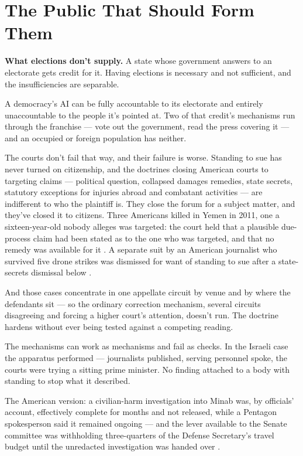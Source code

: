 \part{The Public That Should Form Them}

\textbf{What elections don't supply.} A state whose government answers to an electorate gets credit for it. Having elections is necessary and not sufficient, and the insufficiencies are separable.


A democracy's AI can be fully accountable to its electorate and entirely unaccountable to the people it's pointed at. Two of that credit's mechanisms run through the franchise — vote out the government, read the press covering it — and an occupied or foreign population has neither.

The courts don't fail that way, and their failure is worse. Standing to sue has never turned on citizenship, and the doctrines closing American courts to targeting claims — political question, collapsed damages remedies, state secrets, statutory exceptions for injuries abroad and combatant activities — are indifferent to who the plaintiff is. They close the forum for a subject matter, and they've closed it to citizens. Three Americans killed in Yemen in 2011, one a sixteen-year-old nobody alleges was targeted: the court held that a plausible due-process claim had been stated as to the one who was targeted, and that no remedy was available for it \autocite{alaulaqi2014panetta}. A separate suit by an American journalist who survived five drone strikes was dismissed for want of standing to sue after a state-secrets dismissal below \autocite{kareem2021}.

And those cases concentrate in one appellate circuit by venue and by where the defendants sit — so the ordinary correction mechanism, several circuits disagreeing and forcing a higher court's attention, doesn't run. The doctrine hardens without ever being tested against a competing reading.


The mechanisms can work as mechanisms and fail as checks. In the Israeli case the apparatus performed — journalists published, serving personnel spoke, the courts were trying a sitting prime minister. No finding attached to a body with standing to stop what it described.

The American version: a civilian-harm investigation into Minab was, by officials' account, effectively complete for months and not released, while a Pentagon spokesperson said it remained ongoing \autocite{Bloomberg2026KillChain,fpj2026minabinquiry} — and the lever available to the Senate committee was withholding three-quarters of the Defense Secretary's travel budget until the unredacted investigation was handed over \autocite{stassis2026senate}.

